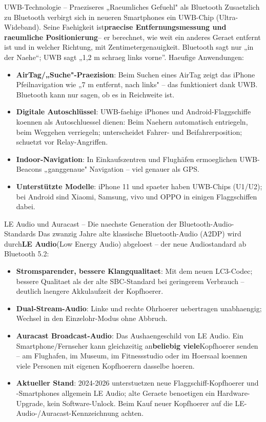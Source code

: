 \begin{tcbinfo}{UWB-Technologie – Praeziseres „Raeumliches Gefuehl" als Bluetooth}
Zusaetzlich zu Bluetooth verbirgt sich in neueren Smartphones ein UWB-Chip (Ultra-Wideband). Seine Faehigkeit ist\textbf{praecise Entfernungsmessung und raeumliche Positionierung}– er berechnet, wie weit ein anderes Geraet entfernt ist und in welcher Richtung, mit Zentimetergenauigkeit. Bluetooth sagt nur „in der Naehe“; UWB sagt „1,2 m schraeg links vorne”. Haeufige Anwendungen:

\begin{itemize}
  \item \textbf{AirTag/„Suche"-Praezision}: Beim Suchen eines AirTag zeigt das iPhone Pfeilnavigation wie „7 m entfernt, nach links" – das funktioniert dank UWB. Bluetooth kann nur sagen, ob es in Reichweite ist.
  \item \textbf{Digitale Autoschlüssel}: UWB-faehige iPhones und Android-Flaggschiffe koennen als Autoschluessel dienen: Beim Naehern automatisch entriegeln, beim Weggehen verriegeln; unterscheidet Fahrer- und Beifahrerposition; schuetzt vor Relay-Angriffen.
  \item \textbf{Indoor-Navigation}: In Einkaufszentren und Flughäfen ermoeglichen UWB-Beacons „ganggenaue" Navigation – viel genauer als GPS.
  \item \textbf{Unterstützte Modelle}: iPhone 11 und spaeter haben UWB-Chips (U1/U2); bei Android sind Xiaomi, Samsung, vivo und OPPO in einigen Flaggschiffen dabei.
\end{itemize}

\end{tcbinfo}

\begin{tcbinfo}{LE Audio und Auracast – Die naechste Generation der Bluetooth-Audio-Standards}
Das zwanzig Jahre alte klassische Bluetooth-Audio (A2DP) wird durch\textbf{LE Audio}(Low Energy Audio) abgeloest – der neue Audiostandard ab Bluetooth 5.2:

\begin{itemize}
  \item \textbf{Stromsparender, bessere Klangqualitaet}: Mit dem neuen LC3-Codec; bessere Qualitaet als der alte SBC-Standard bei geringerem Verbrauch – deutlich laengere Akkulaufzeit der Kopfhoerer.
  \item \textbf{Dual-Stream-Audio}: Linke und rechte Ohrhoerer uebertragen unabhaengig; Wechsel in den Einzelohr-Modus ohne Abbruch.
  \item \textbf{Auracast Broadcast-Audio}: Das Aushaengeschild von LE Audio. Ein Smartphone/Fernseher kann gleichzeitig an\textbf{beliebig viele}Kopfhoerer senden – am Flughafen, im Museum, im Fitnessstudio oder im Hoersaal koennen viele Personen mit eigenen Kopfhoerern dasselbe hoeren.
  \item \textbf{Aktueller Stand}: 2024-2026 unterstuetzen neue Flaggschiff-Kopfhoerer und -Smartphones allgemein LE Audio; alte Geraete benoetigen ein Hardware-Upgrade, kein Software-Unlock. Beim Kauf neuer Kopfhoerer auf die LE-Audio-/Auracast-Kennzeichnung achten.
\end{itemize}

\end{tcbinfo}

